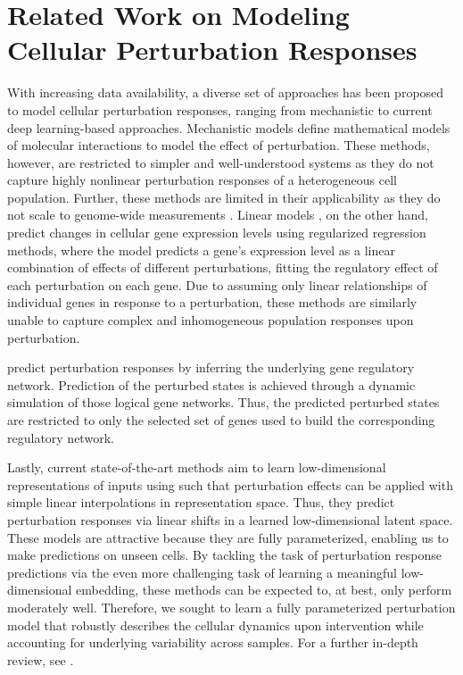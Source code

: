 \section{Related Work on Modeling Cellular Perturbation Responses}

 With increasing data availability, a diverse set of approaches has been proposed to model cellular perturbation responses, ranging from mechanistic to current deep learning-based approaches.
Mechanistic models \citep{yuan2021cellbox, frohlich2018efficient} define mathematical models of molecular interactions to model the effect of perturbation.
These methods, however, are restricted to simpler and well-understood systems as they do not capture highly nonlinear perturbation responses of a heterogeneous cell population. Further, these methods are limited in their applicability as they do not scale to genome-wide measurements \citep{snijder2012single, berchtold2018systems, green2016systems}.
Linear models \citep{dixit2016perturb, kamimoto2020celloracle}, on the other hand,  predict changes in cellular gene expression levels using regularized regression methods, where the model predicts a gene's expression level as a linear combination of effects of different perturbations, fitting the regulatory effect of each perturbation on each gene.
Due to assuming only linear relationships of individual genes in response to a perturbation, these methods are similarly  unable to capture complex and inhomogeneous population responses upon perturbation.

\citet{heydari2022iqcell} predict perturbation responses by inferring the underlying gene regulatory network. Prediction of the perturbed states is achieved through a dynamic simulation of those logical gene networks. Thus, the predicted perturbed states are restricted to only the selected set of genes used to build the corresponding regulatory network.

Lastly, current state-of-the-art methods \citep{lopez2018scvi, lotfollahi2019scgen, yang2020predicting} aim to learn low-dimensional representations of inputs using  such that perturbation effects can be applied with simple linear interpolations in representation space. Thus, they predict perturbation responses via linear shifts in a learned low-dimensional latent space. These models are attractive because they are fully parameterized, enabling us to make predictions on unseen cells. By tackling the task of perturbation response predictions via the even more challenging task of learning a meaningful low-dimensional embedding, these methods can be expected to, at best, only perform moderately well. Therefore, we sought to learn a fully parameterized perturbation model that robustly describes the cellular dynamics upon intervention while accounting for underlying variability across samples. 
For a further in-depth review, see \citet{ji2021machine}.


